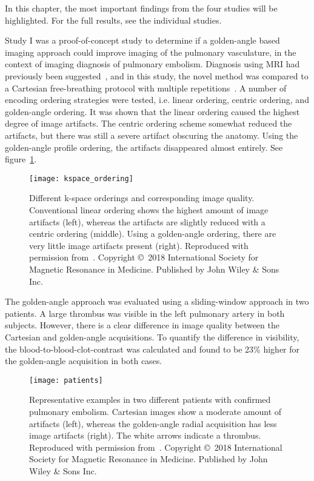 In this chapter, the most important findings from the four studies will be highlighted. For the full results, see the individual studies.

Study I was a proof-of-concept study to determine if a golden-angle based imaging approach could improve imaging of the pulmonary vasculature, in the context of imaging diagnosis of pulmonary embolism. Diagnosis using MRI had previously been suggested~\cite{Stein2010, Kalb2012, Revel2013}, and in this study, the novel method was compared to a Cartesian free-breathing protocol with multiple repetitions~\cite{Nyren2017}. A number of encoding ordering strategies were tested, i.e. linear ordering, centric ordering, and golden-angle ordering. It was shown that the linear ordering caused the highest degree of image artifacts. The centric ordering scheme somewhat reduced the artifacts, but there was still a severe artifact obscuring the anatomy. Using the golden-angle profile ordering, the artifacts disappeared almost entirely. See figure~\ref{fig:study1_2}.
\begin{figure}[htbp]
    \centering
    \texttt{[image: kspace\_ordering]}
    \caption{Different k-space orderings and corresponding image quality. Conventional linear ordering shows the highest amount of image artifacts (left), whereas the artifacts are slightly reduced with a centric ordering (middle). Using a golden-angle ordering, there are very little image artifacts present (right). Reproduced with permission from~\cite{Fyrdahl2018}. Copyright \copyright~2018 International Society for Magnetic Resonance in Medicine. Published by John Wiley \& Sons Inc.}
    \label{fig:study1_2}
\end{figure}
The golden-angle approach was evaluated using a sliding-window approach in two patients. A large thrombus was visible in the left pulmonary artery in both subjects. However, there is a clear difference in image quality between the Cartesian and golden-angle acquisitions. To quantify the difference in visibility, the blood-to-blood-clot-contrast was calculated and found to be 23\% higher for the golden-angle acquisition in both cases.
\begin{figure}[htbp]
    \centering
    \texttt{[image: patients]}
    \caption{Representative examples in two different patients with confirmed pulmonary embolism. Cartesian images show a moderate amount of artifacts (left), whereas the golden-angle radial acquisition has less image artifacts (right). The white arrows indicate a thrombus. Reproduced with permission from~\cite{Fyrdahl2018}. Copyright \copyright~2018 International Society for Magnetic Resonance in Medicine. Published by John Wiley \& Sons Inc.}
    \label{fig:study1_3}
\end{figure}

